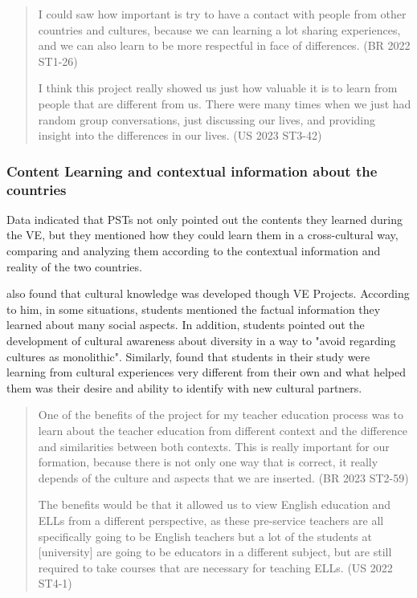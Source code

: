\begin{quote}
I could saw how important is try to have a contact with people
from other countries and cultures, because we can learning a lot sharing
experiences, and we can also learn to be more respectful in face of
differences. (BR 2022 ST1-26)

I think this project really showed us just how valuable it is to
learn from people that are different from us. There were many times when
we just had random group conversations, just discussing our lives, and
providing insight into the differences in our lives. (US 2023 ST3-42)
\end{quote}

\subsubsection{Content Learning and contextual information about the countries}\label{sub-sub-sec-content}
	
Data indicated that PSTs not only pointed out the contents they learned
during the VE, but they mentioned how they could learn them in a
cross-cultural way, comparing and analyzing them according to the
contextual information and reality of the two countries.

\textcite{odowd2021virtual} also found that cultural knowledge was
developed though VE Projects. According to him, in some situations,
students mentioned the factual information they learned about many
social aspects. In addition, students pointed out the development of
cultural awareness about diversity in a way to "avoid regarding cultures
as monolithic". Similarly, \textcite{kopish2020leveraging} found that students
in their study were learning from cultural experiences very different
from their own and what helped them was their desire and ability to
identify with new cultural partners.

\begin{quote}
One of the benefits of the project for my teacher education
process was to learn about the teacher education from different context
and the difference and similarities between both contexts. This is
really important for our formation, because there is not only one way
that is correct, it really depends of the culture and aspects that we
are inserted. (BR 2023 ST2-59)

The benefits would be that it allowed us to view English education
and ELLs from a different perspective, as these pre-service teachers are
all specifically going to be English teachers but a lot of the students
at [university] are going to be educators in a different subject,
but are still required to take courses that are necessary for teaching
ELLs. (US 2022 ST4-1)
\end{quote}
	
